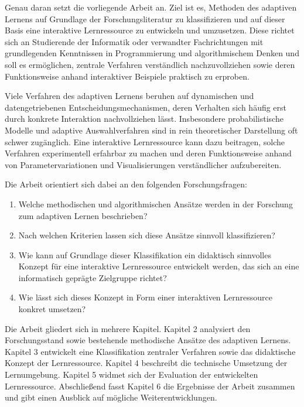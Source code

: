 Genau daran setzt die vorliegende Arbeit an. Ziel ist es, Methoden des
adaptiven Lernens auf Grundlage der Forschungsliteratur zu
klassifizieren und auf dieser Basis eine interaktive Lernressource zu
entwickeln und umzusetzen. Diese richtet sich an Studierende der
Informatik oder verwandter Fachrichtungen mit grundlegenden Kenntnissen
in Programmierung und algorithmischem Denken und soll es ermöglichen,
zentrale Verfahren verständlich nachzuvollziehen sowie deren
Funktionsweise anhand interaktiver Beispiele praktisch zu erproben.

Viele Verfahren des adaptiven Lernens beruhen auf dynamischen und
datengetriebenen Entscheidungsmechanismen, deren Verhalten sich häufig
erst durch konkrete Interaktion nachvollziehen lässt. Insbesondere
probabilistische Modelle und adaptive Auswahlverfahren sind in rein
theoretischer Darstellung oft schwer zugänglich. Eine interaktive
Lernressource kann dazu beitragen, solche Verfahren experimentell
erfahrbar zu machen und deren Funktionsweise anhand von
Parametervariationen und Visualisierungen verständlicher aufzubereiten.

Die Arbeit orientiert sich dabei an den folgenden Forschungsfragen:

\begin{enumerate}
\def\labelenumi{\arabic{enumi}.}
\tightlist
\item
  Welche methodischen und algorithmischen Ansätze werden in der
  Forschung zum adaptiven Lernen beschrieben?
\item
  Nach welchen Kriterien lassen sich diese Ansätze sinnvoll
  klassifizieren?
\item
  Wie kann auf Grundlage dieser Klassifikation ein didaktisch sinnvolles
  Konzept für eine interaktive Lernressource entwickelt werden, das sich
  an eine informatisch geprägte Zielgruppe richtet?
\item
  Wie lässt sich dieses Konzept in Form einer interaktiven Lernressource
  konkret umsetzen?
\end{enumerate}

Die Arbeit gliedert sich in mehrere Kapitel. Kapitel 2 analysiert den
Forschungsstand sowie bestehende methodische Ansätze des adaptiven
Lernens. Kapitel 3 entwickelt eine Klassifikation zentraler Verfahren
sowie das didaktische Konzept der Lernressource. Kapitel 4 beschreibt
die technische Umsetzung der Lernumgebung. Kapitel 5 widmet sich der
Evaluation der entwickelten Lernressource. Abschließend fasst Kapitel 6
die Ergebnisse der Arbeit zusammen und gibt einen Ausblick auf mögliche
Weiterentwicklungen.
